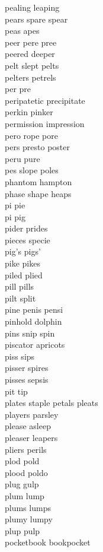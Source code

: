 pealing leaping\\
pears spare spear\\
peas apes\\
peer pere pree\\
peered deeper\\
pelt slept pelts \\
pelters petrels\\
per pre\\
peripatetic precipitate\\
perkin pinker\\
permission impression\\
pero rope pore\\
pers presto poster  \\
peru pure\\
pes slope poles  \\
phantom hampton\\
phase shape heaps\\
pi pie \\
pi pig \\
pider prides \\
pieces specie\\
pig's pigs'\\
pike pikes \\
piled plied\\
pill pills \\
pilt split \\
pine penis pensi \\
pinhold dolphin\\
pins snip spin\\
piscator apricots\\
piss sips\\
pisser spires\\
pisses sepsis\\
pit tip\\
plates staple petals pleats\\
players parsley\\
please asleep\\
pleaser leapers\\
pliers perils\\
plod pold\\
plood poldo\\
plug gulp\\
plum lump\\
plums lumps\\
plumy lumpy\\
plup pulp\\
pocketbook bookpocket\\
